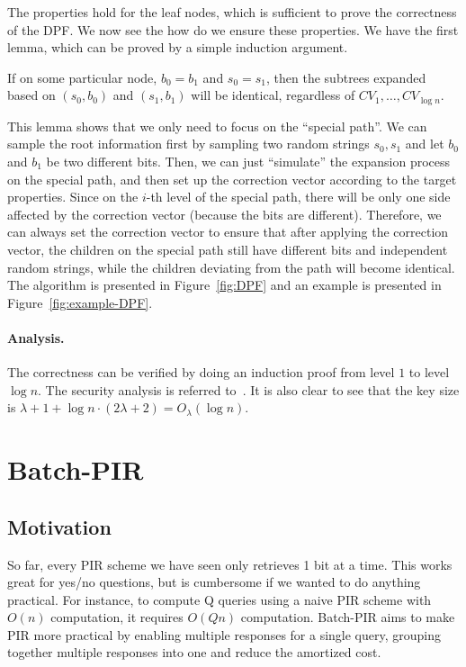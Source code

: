 The properties hold for the leaf nodes, which is sufficient to prove the correctness of the DPF.
We now see the how do we ensure these properties.
We have the first lemma, which can be proved by a simple induction argument.

\begin{lemma}
    If on some particular node, $b_0=b_1$ and $s_0=s_1$, then the subtrees expanded based on $(s_0,b_0)$ and $(s_1,b_1)$ will be identical, regardless of $CV_1,\dots,CV_{\log n}$.
\end{lemma}

This lemma shows that we only need to focus on the ``special path''. We can sample the root information first by sampling two random strings $s_0,s_1$ and let $b_0$ and $b_1$ be two different bits. 
Then, we can just ``simulate'' the expansion process on the special path, and then set up the correction vector according to the target properties. 
Since on the $i$-th level of the special path, there will be only one side affected by the correction vector (because the bits are different).
Therefore, we can always set the correction vector to ensure that after applying the correction vector, the children on the special path still have different bits and independent random strings, while the children deviating from the path will become identical.
The algorithm is presented in Figure~\ref{fig:DPF} and an example is presented in Figure~\ref{fig:example-DPF}.


\paragraph{Analysis.}
The correctness can be verified by doing an induction proof from level $1$ to level $\log n$.
The security analysis is referred to~\cite{boyle2016function}. 
It is also clear to see that the key size is $\lambda+1+\log n\cdot (2\lambda+2)=O_\lambda(\log n)$.



 \section{Batch-PIR}

 \subsection{Motivation}
    So far, every PIR scheme we have seen only retrieves 1 bit at a time. This works great for yes/no questions,
    but is cumbersome if we wanted to do anything practical. For instance, to compute Q queries using a naive PIR scheme with $O(n)$ computation, it requires $O(Qn)$ computation.
    Batch-PIR aims to make PIR more practical by enabling multiple
    responses for a single query, grouping together multiple responses into one and reduce the
     amortized cost.
     
